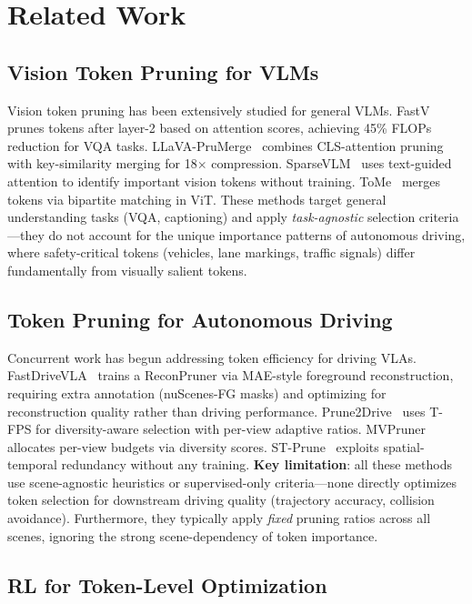 \documentclass[letterpaper]{article} %
\begin{document}
\section{Related Work}
\label{sec:related}

\subsection{Vision Token Pruning for VLMs}

Vision token pruning has been extensively studied for general VLMs.
FastV~\citep{fastv2024} prunes tokens after layer-2 based on attention scores, achieving 45\% FLOPs reduction for VQA tasks.
LLaVA-PruMerge~\citep{llava_prumerge2024} combines CLS-attention pruning with key-similarity merging for 18$\times$ compression.
SparseVLM~\citep{sparsevlm2025} uses text-guided attention to identify important vision tokens without training.
ToMe~\citep{tome2023} merges tokens via bipartite matching in ViT.
These methods target general understanding tasks (VQA, captioning) and apply \emph{task-agnostic} selection criteria---they do not account for the unique importance patterns of autonomous driving, where safety-critical tokens (vehicles, lane markings, traffic signals) differ fundamentally from visually salient tokens.

\subsection{Token Pruning for Autonomous Driving}

Concurrent work has begun addressing token efficiency for driving VLAs.
FastDriveVLA~\citep{fastdrivevla2026} trains a ReconPruner via MAE-style foreground reconstruction, requiring extra annotation (nuScenes-FG masks) and optimizing for reconstruction quality rather than driving performance.
Prune2Drive~\citep{prune2drive2026} uses T-FPS for diversity-aware selection with per-view adaptive ratios.
MVPruner~\citep{mvpruner2026} allocates per-view budgets via diversity scores.
ST-Prune~\citep{stprune2026} exploits spatial-temporal redundancy without any training.
\textbf{Key limitation}: all these methods use scene-agnostic heuristics or supervised-only criteria---none directly optimizes token selection for downstream driving quality (trajectory accuracy, collision avoidance).
Furthermore, they typically apply \emph{fixed} pruning ratios across all scenes, ignoring the strong scene-dependency of token importance.

\subsection{RL for Token-Level Optimization}
\end{document}
